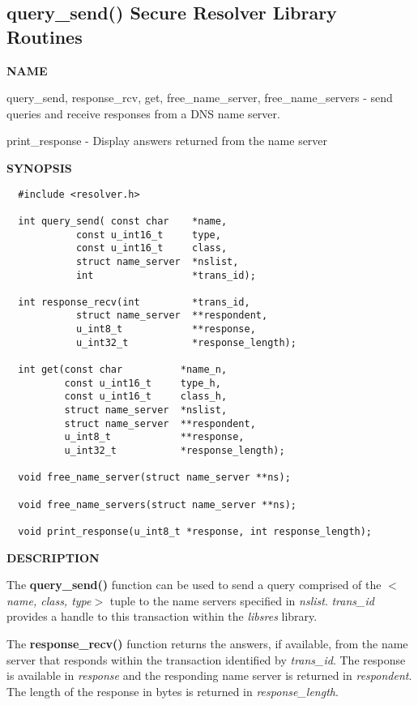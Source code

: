 \clearpage

\subsection{{\bf query\_send()} Secure Resolver Library Routines}


{\bf NAME}

query\_send, response\_rcv, get, free\_name\_server, free\_name\_servers -
send queries and receive responses from a DNS name server.

print\_response - Display answers returned from the name server

{\bf SYNOPSIS}

\begin{verbatim}
  #include <resolver.h>

  int query_send( const char    *name,
            const u_int16_t     type,
            const u_int16_t     class,
            struct name_server  *nslist,
            int                 *trans_id);

  int response_recv(int         *trans_id,
            struct name_server  **respondent,
            u_int8_t            **response,
            u_int32_t           *response_length);

  int get(const char          *name_n,
          const u_int16_t     type_h,
          const u_int16_t     class_h,
          struct name_server  *nslist,
          struct name_server  **respondent,
          u_int8_t            **response,
          u_int32_t           *response_length);

  void free_name_server(struct name_server **ns);

  void free_name_servers(struct name_server **ns);

  void print_response(u_int8_t *response, int response_length);
\end{verbatim}

{\bf DESCRIPTION}

The {\bf query\_send()} function can be used to send a query comprised of the
$<${\it name, class, type}$>$ tuple to the name servers specified in {\it
nslist}.  {\it trans\_id} provides a handle to this transaction within the
{\it libsres} library.

The {\bf response\_recv()} function returns the answers, if available, from the
name server that responds within the transaction identified by {\it trans\_id}.
The response is available in {\it response} and the responding name server is
returned in {\it respondent}.  The length of the response in bytes is returned
in {\it response\_length}.

